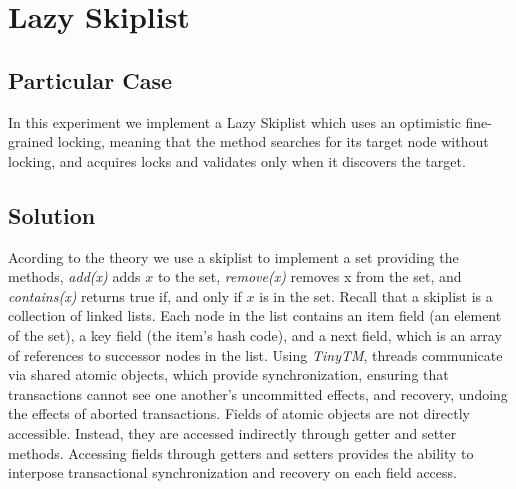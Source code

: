


\section{\textbf{Lazy Skiplist}}



\subsection{Particular Case}
\par
In this experiment we implement a Lazy Skiplist which uses an optimistic fine-grained locking, meaning that the method searches for its target node without locking, and acquires locks and validates only when it discovers the target. 
\par



\subsection{Solution}
\par
Acording to the theory we use a skiplist to implement a set providing the methods, \textit{add(x)} adds $x$ to the set, \textit{remove(x)} removes x from the set, and \textit{contains(x)} returns true if, and only if $x$ is in the set.
Recall that a skiplist is a collection of linked lists. Each node in the list contains an item field (an element of the set), a key field (the item’s hash code), and a next field, which is an array of references to successor nodes in the list.
Using \textit{TinyTM}, threads communicate via shared atomic objects, which provide synchronization, ensuring that transactions cannot see one another's uncommitted effects, and recovery, undoing the effects of aborted transactions. Fields of atomic objects are not directly accessible. Instead, they are accessed indirectly through getter and setter methods.
Accessing fields through getters and setters provides the ability to interpose transactional synchronization and recovery on each field access.


